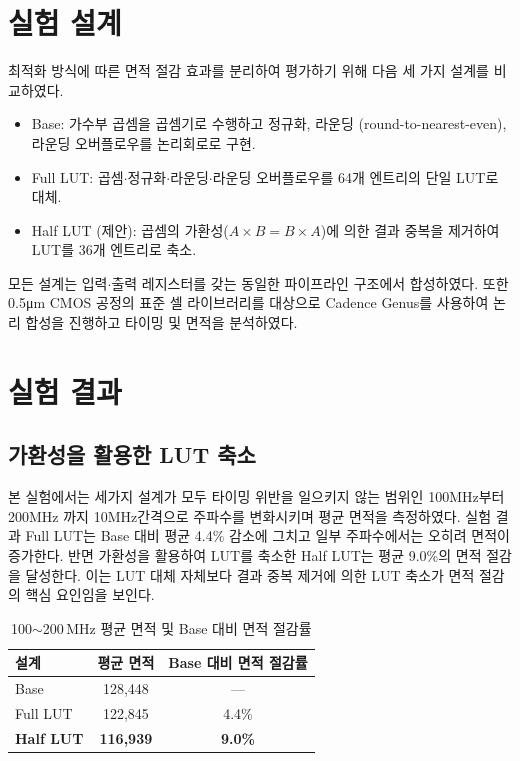 \documentclass[10pt,a4paper,twocolumn]{article}
\begin{document}
\section{실험 설계}

최적화 방식에 따른 면적 절감 효과를 분리하여 평가하기 위해 다음 세 가지 설계를 비교하였다.
\begin{itemize}[leftmargin=1.2em,itemsep=1pt,topsep=2pt]
  \item Base: 가수부 곱셈을 곱셈기로 수행하고 정규화, 라운딩
        (round-to-nearest-even), 라운딩 오버플로우를 논리회로로 구현.
  \item Full LUT: 곱셈$\cdot$정규화$\cdot$라운딩$\cdot$라운딩
        오버플로우를 64개 엔트리의 단일 LUT로 대체.
  \item Half LUT (제안): 곱셈의 가환성($A\times B = B\times A$)에
        의한 결과 중복을 제거하여 LUT를 36개 엔트리로 축소.
\end{itemize}
모든 설계는 입력$\cdot$출력 레지스터를 갖는 동일한 파이프라인 구조에서
합성하였다. 
또한 0.5μm CMOS 공정의 표준 셀 라이브러리를 대상으로 Cadence Genus를 사용하여 논리 합성을 진행하고 타이밍 및 면적을 분석하였다.
\section{실험 결과}

\subsection{가환성을 활용한 LUT 축소}
본 실험에서는 세가지 설계가 모두 타이밍 위반을 일으키지 않는 범위인 100MHz부터 200MHz 까지 10MHz간격으로 주파수를 변화시키며 평균 면적을 측정하였다.
실험 결과 Full LUT는 Base 대비 평균 4.4\%
감소에 그치고 일부 주파수에서는 오히려 면적이 증가한다.
반면 가환성을 활용하여 LUT를 축소한 Half LUT는 평균 9.0\%의 면적
절감을 달성한다. 
이는 LUT 대체 자체보다 결과 중복 제거에 의한 LUT
축소가 면적 절감의 핵심 요인임을 보인다.

\begin{table}[h]
  \centering
  \caption{100$\sim$200\,MHz 평균 면적 및 Base 대비 면적 절감률}
  \label{tab:avg}
  \footnotesize
  \begin{tabular}{lcc}
    \toprule
    \textbf{설계} & \textbf{평균 면적} & \textbf{Base 대비 면적 절감률} \\
    \midrule
    Base     & 128,448 & --- \\
    Full LUT & 122,845 & 4.4\% \\
    \textbf{Half LUT} & \textbf{116,939} & \textbf{9.0\%} \\
    \bottomrule
  \end{tabular}
\end{table}
\end{document}
